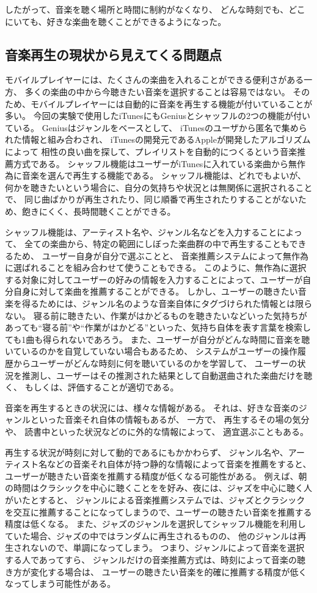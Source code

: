 \documentclass[11pt, onecolumn]{jsarticle}
\begin{document}
したがって、音楽を聴く場所と時間に制約がなくなり、
どんな時刻でも、どこにいても、好きな楽曲を聴くことができるようになった。

\subsection{音楽再生の現状から見えてくる問題点}
モバイルプレイヤーには、たくさんの楽曲を入れることができる便利さがある一方、
多くの楽曲の中から今聴きたい音楽を選択することは容易ではない。
そのため、モバイルプレイヤーには自動的に音楽を再生する機能が付いていることが多い。
今回の実験で使用したiTunesにもGeniusとシャッフルの2つの機能が付いている。
Geniusはジャンルをベースとして、
iTunesのユーザから匿名で集められた情報と組み合わされ、
iTunesの開発元であるAppleが開発したアルゴリズムによって
相性の良い曲を探して、プレイリストを自動的につくるという音楽推薦方式である。
シャッフル機能はユーザーがiTunesに入れている楽曲から無作為に音楽を選んで再生する機能である。
シャッフル機能は、どれでもよいが、何かを聴きたいという場合に、自分の気持ちや状況とは無関係に選択されることで、
同じ曲ばかりが再生されたり、同じ順番で再生されたりすることがないため、飽きにくく、長時間聴くことができる。

シャッフル機能は、アーティスト名や、ジャンル名などを入力することによって、
全ての楽曲から、特定の範囲にしぼった楽曲群の中で再生することもできるため、
ユーザー自身が自分で選ぶことと、
音楽推薦システムによって無作為に選ばれることを組み合わせて使うこともできる。
このように、無作為に選択する対象に対してユーザーの好みの情報を入力することによって、ユーザーが自分自身に対して楽曲を推薦することができる。
しかし、ユーザーの聴きたい音楽を得るためには、ジャンル名のような音楽自体にタグづけられた情報とは限らない。
寝る前に聴きたい、作業がはかどるものを聴きたいなどいった気持ちがあっても``寝る前''や``作業がはかどる''といった、気持ち自体を表す言葉を検索しても1曲も得られないであろう。
また、ユーザーが自分がどんな時間に音楽を聴いているのかを自覚していない場合もあるため、
システムがユーザーの操作履歴からユーザーがどんな時刻に何を聴いているのかを学習して、
ユーザーの状況を推測し、ユーザーはその推測された結果として自動選曲された楽曲だけを聴く、
もしくは、評価することが適切である。

音楽を再生するときの状況には、様々な情報がある。
それは、好きな音楽のジャンルといった音楽それ自体の情報もあるが、
一方で、
再生するその場の気分や、
読書中といった状況などのに外的な情報によって、
適宜選ぶこともある。

再生する状況が時刻に対して動的であるにもかかわらず、
ジャンル名や、アーティスト名などの音楽それ自体が持つ静的な情報によって音楽を推薦をすると、
ユーザーが聴きたい音楽を推薦する精度が低くなる可能性がある。
例えば、朝の時間はクラシックを中心に聴くことをを好み、夜には、ジャズを中心に聴く人がいたとすると、
ジャンルによる音楽推薦システムでは、ジャズとクラシックを交互に推薦することになってしまうので、ユーザーの聴きたい音楽を推薦する精度は低くなる。
また、ジャズのジャンルを選択してシャッフル機能を利用していた場合、ジャズの中ではランダムに再生されるものの、
他のジャンルは再生されないので、単調になってしまう。
つまり、ジャンルによって音楽を選択する人であってすら、
ジャンルだけの音楽推薦方式は、時刻によって音楽の聴き方が変化する場合は、
ユーザーの聴きたい音楽を的確に推薦する精度が低くなってしまう可能性がある。
\end{document}
